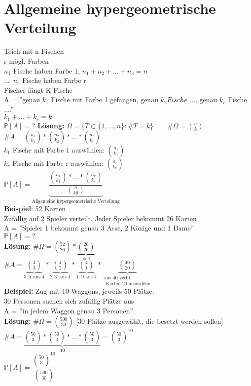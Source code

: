 \section{Allgemeine hypergeometrische Verteilung}
Teich mit n Fischen\\
r mögl. Farben\\
$n_1$ Fische haben Farbe 1, \hspace{1cm} $n_1 + n_2 +...+n_3 = n$\\
...\
$n_r$ Fische haben Farbe r\medskip\\
Fischer fängt K Fische\\
 A = ''genau $k_1$ Fische mit Farbe 1 gefangen, genau $k_2 Fische $ ..., genau $k_r$ Fische ....''\\
 $k_1 + ... + k_r = k$\smallskip\\
 $\mathds{P}[A] = ?$\newpage
 \textbf{Lösung:} $\Omega = \{ T \subset \{1,...,n\}:\#T=k\} \qquad \#\Omega = \binom{n}{k}$\\
 $\#A = \binom{n_1}{k_1} * \binom{n_2}{k_2}*...*\binom{n_r}{k_r}$\medskip\\
 $k_1$ Fische mit Farbe 1 auswählen: $\binom{n_1}{k_1}$\\
 $k_r$ Fische mit Farbe r auswählen: $\binom{n_r}{k_r}$\medskip\\
 $\mathds{P}[A] = \underbrace{\dfrac{\binom{n_1}{k_1}*...*\binom{n_r}{k_r}}{\binom{n}{k0}}}_\text{Allgemeine hypergeometrische Verteilung}$\medskip\\
 \textbf{Beispiel}: 52 Karten\\
 Zufällig auf 2 Spieler verteilt. Jeder Spieler bekommt 26 Karten\medskip\\
 A = ''Spieler 1 bekommt genau 3 Asse, 2 Könige und 1 Dame''\\
 $\mathds{P}[A] = ?$\medskip\\
 \textbf{Lösung:} $\#\Omega = \binom{52}{26} * \underbrace{\binom{26}{26}}_{=1}$\medskip\\
 $\#A=\underbrace{\binom{4}{3}}_\text{3 A aus 4}*\underbrace{\binom{4}{2}}_\text{2 K aus 4}*\underbrace{\binom{4}{1}}_\text{1 D aus 4}*\underbrace{\binom{40}{20}}_{\substack{\text{aus 40 verbl.}\\\text{ Karten 20 auswählen}}}$\medskip\\
 \textbf{Beispiel:} Zug mit 10 Waggons, jeweils 50 Plätze.\\
 30 Personen suchen sich zufällig Plätze aus\smallskip\\
 A = ''in jedem Waggon genau 3 Personen''\medskip\\
 \textbf{Lösung:} $\#\Omega = \binom{500}{30}$ [30 Plätze ausgewählt, die besetzt werden sollen]\medskip\\
 $\#A = \underbrace{\binom{50}{3}*\binom{50}{3}*...*\binom{50}{3}}_10 = \binom{50}{3}^{10}$\smallskip\\
 $\mathds{P}[A] = \dfrac{\binom{50}{3}^{10}}{\binom{500}{30}}$
